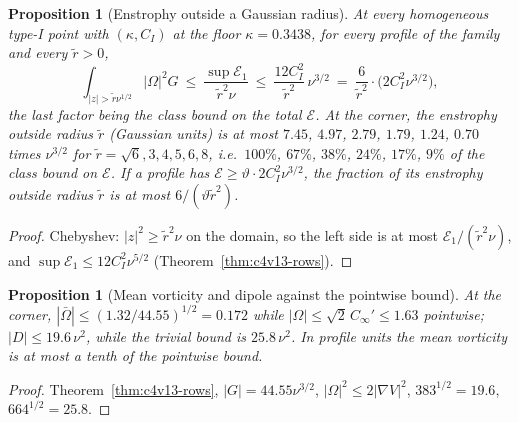 \documentclass[11pt]{article}
\theoremstyle{plain}
\newtheorem{proposition}[theorem]{Proposition}
\theoremstyle{definition}
\theoremstyle{remark}
\begin{document}
\begin{proposition}[Enstrophy outside a Gaussian radius]
\label{prop:c4v18-outside}
At every homogeneous type-I point with \((\kappa,C_I)\) at the floor
\(\kappa=0.3438\), for every profile of the family and every \(\tilde r>0\),
\begin{equation}
 \int_{|z|>\tilde r\nu^{1/2}}|\Omega|^2G\ \le\ \frac{\sup\mathcal E_1}{\tilde r^2\nu}\ \le\ \frac{12C_I^2}{\tilde r^2}\,\nu^{3/2}
 \ =\ \frac6{\tilde r^2}\cdot\bigl(2C_I^2\nu^{3/2}\bigr),
 \label{eq:c4v18-outside}
\end{equation}
the last factor being the class bound on the total \(\mathcal E\).  At the
corner, the enstrophy outside radius \(\tilde r\) (Gaussian units) is at
most \(7.45\), \(4.97\), \(2.79\), \(1.79\), \(1.24\), \(0.70\) times \(\nu^{3/2}\) for
\(\tilde r=\sqrt6,3,4,5,6,8\), i.e.\ \(100\%\), \(67\%\), \(38\%\), \(24\%\), \(17\%\), \(9\%\) of the class
bound on \(\mathcal E\).  If a profile has \(\mathcal E\ge\vartheta\cdot2C_I^2\nu^{3/2}\), the fraction of its
enstrophy outside radius \(\tilde r\) is at most \(6/(\vartheta\tilde r^2)\).
\end{proposition}

\begin{proof}
Chebyshev: \(|z|^2\ge\tilde r^2\nu\) on the domain, so the left side is at most
\(\mathcal E_1/(\tilde r^2\nu)\), and \(\sup\mathcal E_1\le12C_I^2\nu^{5/2}\) (Theorem~\ref{thm:c4v13-rows}).
\end{proof}

\begin{proposition}[Mean vorticity and dipole against the pointwise bound]
\label{prop:c4v18-mean}
At the corner, \(|\bar\Omega|\le(1.32/44.55)^{1/2}=0.172\) while \(|\Omega|\le\sqrt2\,C_\infty'\le1.63\) pointwise;
\(|D|\le19.6\,\nu^2\), while the trivial bound is \(25.8\,\nu^2\).  In profile units
the mean vorticity is at most a tenth of the pointwise bound.
\end{proposition}

\begin{proof}
Theorem~\ref{thm:c4v13-rows}, \(|G|=44.55\nu^{3/2}\), \(|\Omega|^2\le2|\nabla V|^2\), \(383^{1/2}=19.6\), \(664^{1/2}=25.8\).
\end{proof}
\end{document}
